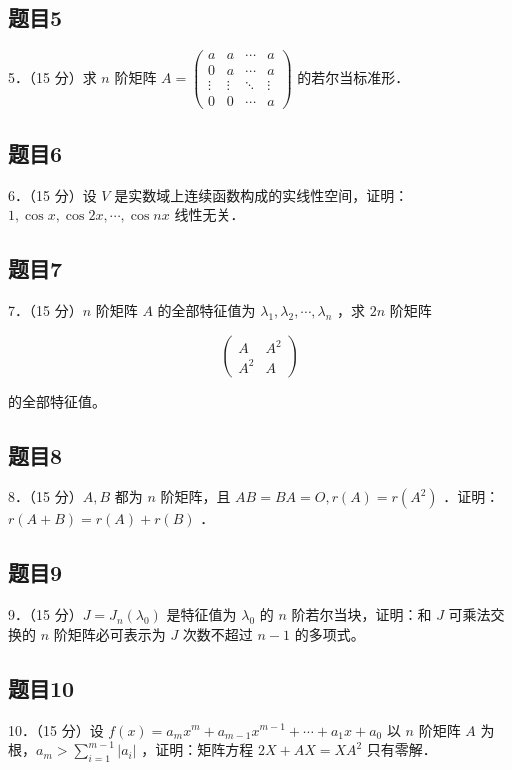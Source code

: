 \documentclass{article}
\begin{document}
\subsection{题目5}
5．（15 分）求 \(n\) 阶矩阵 \(A=\left(\begin{array}{cccc}a & a & \cdots & a \\ 0 & a & \cdots & a \\ \vdots & \vdots & \ddots & \vdots \\ 0 & 0 & \cdots & a\end{array}\right)\) 的若尔当标准形．

\subsection{题目6}
6．（15 分）设 \(V\) 是实数域上连续函数构成的实线性空间，证明： \(1, \cos x, \cos 2 x, \cdots, \cos n x\) 线性无关．

\subsection{题目7}
7．（15 分）\(n\) 阶矩阵 \(A\) 的全部特征值为 \(\lambda_{1}, \lambda_{2}, \cdots, \lambda_{n}\) ，求 \(2 n\) 阶矩阵

\[
\left(\begin{array}{cc}
A & A^{2} \\
A^{2} & A
\end{array}\right)
\]

的全部特征值。

\subsection{题目8}
8．（15 分）\(A, B\) 都为 \(n\) 阶矩阵，且 \(A B=B A=O, r(A)=r\left(A^{2}\right)\) ．证明：\(r(A+B)=r(A)+r(B)\) ．

\subsection{题目9}
9．（15 分）\(J=J_{n}\left(\lambda_{0}\right)\) 是特征值为 \(\lambda_{0}\) 的 \(n\) 阶若尔当块，证明：和 \(J\) 可乘法交换的 \(n\) 阶矩阵必可表示为 \(J\) 次数不超过 \(n-1\) 的多项式。

\subsection{题目10}
10．（15 分）设 \(f(x)=a_{m} x^{m}+a_{m-1} x^{m-1}+\cdots+a_{1} x+a_{0}\) 以 \(n\) 阶矩阵 \(A\) 为根，\(a_{m}>\sum_{i=1}^{m-1}\left|a_{i}\right|\) ，证明：矩阵方程 \(2 X+A X=X A^{2}\) 只有零解．
\end{document}
